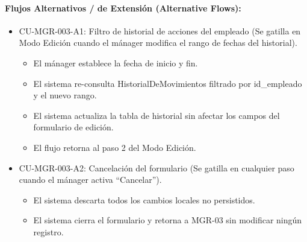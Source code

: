 \paragraph{Flujos Alternativos / de Extensión (Alternative Flows):}
\begin{itemize}
    \item CU-MGR-003-A1: Filtro de historial de acciones del empleado (Se gatilla en Modo Edición cuando el mánager modifica el rango de fechas del historial).
    \begin{itemize}
        \item El mánager establece la fecha de inicio y fin.
        \item El sistema re-consulta HistorialDeMovimientos filtrado por id\_empleado y el nuevo rango.
        \item El sistema actualiza la tabla de historial sin afectar los campos del formulario de edición.
        \item El flujo retorna al paso 2 del Modo Edición.
    \end{itemize}
    \item CU-MGR-003-A2: Cancelación del formulario (Se gatilla en cualquier paso cuando el mánager activa ``Cancelar'').
    \begin{itemize}
        \item El sistema descarta todos los cambios locales no persistidos.
        \item El sistema cierra el formulario y retorna a MGR-03 sin modificar ningún registro.
    \end{itemize}
\end{itemize}

